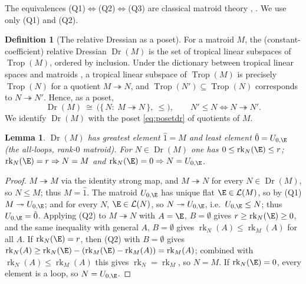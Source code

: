 \documentclass[11pt]{article}
\newcommand{\Dr}{\operatorname{Dr}}
\newcommand{\Trop}{\operatorname{Trop}}
\newcommand{\cL}{\mathcal{L}}
\newcommand{\rk}{\operatorname{rk}}
\newtheorem{lemma}{Lemma}
\theoremstyle{definition}
\newtheorem{definition}{Definition}
\theoremstyle{remark}
\begin{document}
The equivalences (Q1)$\Leftrightarrow$(Q2)$\Leftrightarrow$(Q3) are classical
matroid theory \cite[\S7.3]{White}, \cite[\S7.3]{Brylawski}. We use only (Q1) and
(Q2).

\begin{definition}[The relative Dressian as a poset]\label{def:dr}
For a matroid $M$, the (constant-coefficient) relative Dressian $\Dr(M)$ is the set
of tropical linear subspaces of $\Trop(M)$, ordered by inclusion. Under the
dictionary between tropical linear spaces and matroids \cite{Speyer,MaclaganSturmfels},
a tropical linear subspace of $\Trop(M)$ is precisely $\Trop(N)$ for a quotient
$M\twoheadrightarrow N$, and $\Trop(N')\subseteq\Trop(N)$ corresponds to
$N\twoheadrightarrow N'$. Hence, as a poset,
\begin{equation}
\Dr(M)\ \cong\ \bigl(\{\,N:\ M\twoheadrightarrow N\,\},\ \le\bigr),
\qquad N'\le N \iff N\twoheadrightarrow N'.
\label{eq:posetdr}
\end{equation}
We identify $\Dr(M)$ with the poset \eqref{eq:posetdr} of quotients of $M$.
\end{definition}

\begin{lemma}\label{lem:extremes}
$\Dr(M)$ has greatest element $\hat 1=M$ and least element $\hat 0=U_{0,\E}$ (the
all-loops, rank-$0$ matroid). For $N\in\Dr(M)$ one has $0\le\rk_N(\E)\le r$;
$\rk_N(\E)=r\Rightarrow N=M$ and $\rk_N(\E)=0\Rightarrow N=U_{0,\E}$.
\end{lemma}

\begin{proof}
$M\twoheadrightarrow M$ via the identity strong map, and $M\twoheadrightarrow N$ for
every $N\in\Dr(M)$, so $N\le M$; thus $M=\hat 1$. The matroid $U_{0,\E}$ has unique
flat $\E\in\cL(M)$, so by (Q1) $M\twoheadrightarrow U_{0,\E}$; and for every
$N$, $\E\in\cL(N)$, so $N\twoheadrightarrow U_{0,\E}$, i.e.\ $U_{0,\E}\le N$; thus
$U_{0,\E}=\hat 0$. Applying (Q2) to $M\twoheadrightarrow N$ with $A=\E$, $B=\emptyset$
gives $r\ge\rk_N(\E)\ge 0$, and the same inequality with general $A$, $B=\emptyset$
gives $\rk_N(A)\le\rk_M(A)$ for all $A$. If $\rk_N(\E)=r$, then (Q2) with $B=\emptyset$
gives $\rk_N(A)\ge\rk_N(\E)-(\rk_M(\E)-\rk_M(A))=\rk_M(A)$; combined with
$\rk_N(A)\le\rk_M(A)$ this gives $\rk_N=\rk_M$, so $N=M$. If $\rk_N(\E)=0$, every
element is a loop, so $N=U_{0,\E}$.
\end{proof}
\end{document}

